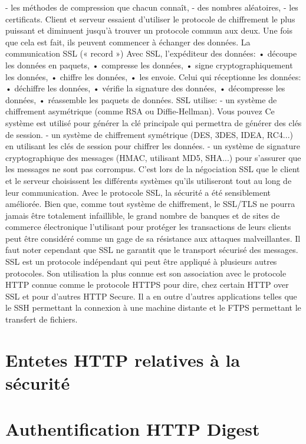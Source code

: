 -	les méthodes de compression que chacun connaît,
-	des nombres aléatoires,
-	les certificats.
Client et serveur essaient d'utiliser le protocole de chiffrement le plus puissant et diminuent jusqu'à trouver un protocole commun aux deux. Une fois que cela est fait, ils peuvent commencer à échanger des données. 
La communication SSL (« record »)
Avec SSL, l'expéditeur des données:
•	découpe les données en paquets,
•	compresse les données,
•	signe cryptographiquement les données,
•	chiffre les données,
•	les envoie.
Celui qui réceptionne les données:
•	déchiffre les données,
•	vérifie la signature des données,
•	décompresse les données,
•	réassemble les paquets de données.
SSL utilise:
-	un système de chiffrement asymétrique (comme RSA ou Diffie-Hellman). Vous pouvez Ce système est utilisé pour générer la clé principale qui permettra de générer des clés de session.
-	un système de chiffrement symétrique (DES, 3DES, IDEA, RC4...) en utilisant les clés de session pour chiffrer les données.
-	un système de signature cryptographique des messages (HMAC, utilisant MD5, SHA...) pour s'assurer que les messages ne sont pas corrompus.
C'est lors de la négociation SSL que le client et le serveur choisissent les différents systèmes qu’ils utiliseront tout au long de leur communication.
Avec le protocole SSL, la sécurité a été sensiblement améliorée. Bien que, comme tout système de chiffrement, le SSL/TLS ne pourra jamais être totalement infaillible, le grand nombre de banques et de sites de commerce électronique l'utilisant pour protéger les transactions de leurs clients peut être considéré comme un gage de sa résistance aux attaques malveillantes. Il faut noter cependant que SSL ne garantit que le transport sécurisé des messages.
SSL est un protocole indépendant qui peut être appliqué à plusieurs autres protocoles. Son utilisation la plus connue est son association avec le protocole HTTP connue comme le protocole HTTPS pour dire, chez certain HTTP over SSL et pour d’autres HTTP Secure. Il a en outre d’autres applications telles que le SSH permettant la connexion à une machine distante et le FTPS permettant le transfert de fichiers.

\section*{Entetes HTTP relatives à la sécurité}

\section*{Authentification HTTP Digest}

%
%
